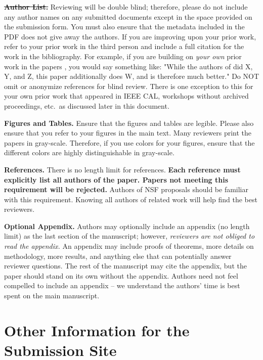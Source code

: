 \documentclass[pageno]{jpaper}
\begin{document}
\noindent\textbf{\sout{Author List.}} Reviewing will be double blind;
therefore, please do not include any author names on any submitted
documents except in the space provided on the submission form.  You must
also ensure that the metadata included in the PDF does not give away the
authors. If you are improving upon your prior work, refer to your prior
work in the third person and include a full citation for the work in the
bibliography.  For example, if you are building on {\em your own} prior
work in the papers \cite{nicepaper1,nicepaper2,nicepaper3}, you would say
something like: "While the authors of
\cite{nicepaper1,nicepaper2,nicepaper3} did X, Y, and Z, this paper
additionally does W, and is therefore much better."  Do NOT omit or
anonymize references for blind review.  There is one exception to this for
your own prior work that appeared in IEEE CAL, workshops without archived
proceedings, etc.\, as discussed later in this document.

\noindent\textbf{Figures and Tables.} Ensure that the figures and tables
are legible.  Please also ensure that you refer to your figures in the main
text.  Many reviewers print the papers in gray-scale. Therefore, if you use
colors for your figures, ensure that the different colors are highly
distinguishable in gray-scale.

\noindent\textbf{References.}  There is no length limit for references.
{\bf Each reference must explicitly list all authors of the paper.  Papers
not meeting this requirement will be rejected.} Authors of NSF proposals
should be familiar with this requirement. Knowing all authors of related
work will help find the best reviewers.

\noindent\textbf{Optional Appendix.}  Authors may optionally include an
appendix (no length limit) as the last section of the manuscript; however,
{\em reviewers are not obliged to read the appendix.}  An appendix may
include proofs of theorems, more details on methodology, more results, and
anything else that can potentially answer reviewer questions.  The rest of
the manuscript may cite the appendix, but the paper should stand on its own
without the appendix.  Authors need not feel compelled to include an
appendix -- we understand the authors' time is best spent on the main
manuscript.

\section{Other Information for the Submission Site}
\end{document}
